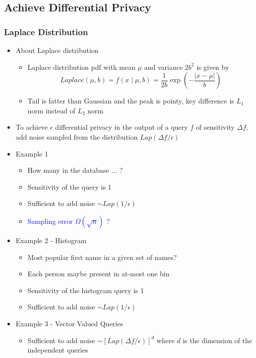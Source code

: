 \documentclass{article}
\newcommand{\blue}[1]{\textcolor{blue}{#1}}
\begin{document}
\subsection{Achieve Differential Privacy}

\subsubsection{Laplace Distribution}

\begin{itemize}
    \item About Laplace distribution
        \begin{itemize}
            \item Laplace distribution pdf with mean $\mu$ and variance $2b^2$ is given by
                $$Laplace(\mu,b) = f(x\mid \mu ,b) ={\frac  {1}{2b}}\exp \left(-{\frac  {|x-\mu |}{b}}\right)$$
            \item Tail is fatter than Gaussian and the peak is pointy, key difference is $L_1$ norm instead of $L_2$ norm
        \end{itemize}
    \item To achieve $\epsilon$ differential privacy in the output of a query $f$ of sensitivity $\Delta f$, add noise sampled from the distribution $Lap(\Delta f / \epsilon)$
    \item Example 1
        \begin{itemize}
            \item How many in the database $\dots$ ?
            \item Sensitivity of the query is 1
            \item Sufficient to add noise $\sim Lap(1/\epsilon)$
            \item \blue{Sampling error $\Omega(\sqrt{n})$ ?}
        \end{itemize}
    \item Example 2 - Histogram
        \begin{itemize}
            \item Most popular first name in a given set of names?
            \item Each person maybe present in at-most one bin
            \item Sensitivity of the histogram query is 1
            \item Sufficient to add noise $\sim Lap(1/\epsilon)$
        \end{itemize}
    \item Example 3 - Vector Valued Queries
        \begin{itemize}
            \item Sufficient to add noise $\sim [Lap(\Delta f/\epsilon)]^d$ where $d$ is the dimension of the independent queries
        \end{itemize}
\end{itemize}
\end{document}
